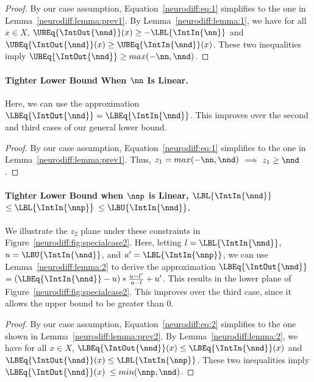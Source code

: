 \begin{proof}
By our case assumption, Equation~\ref{neurodiff:eq:1} simplifies to the one in
Lemma~\ref{neurodiff:lemma:prev1}. By Lemma~\ref{neurodiff:lemma:1}, we have for
all $ x \in X $,
$ \UBEq{\IntOut{\nnd}}(x) \geq -\LBL{\IntIn{\nn}} $ and
$ \UBEq{\IntOut{\nnd}}(x) \geq \UBEq{\IntIn{\nnd}}(x) $. These two inequalities
imply $ \UBEq{\IntOut{\nnd}} \geq max(-\nn, \nnd) $.
\end{proof}

\paragraph{Tighter Lower Bound When $ \nn $ Is Linear.}

Here, we can use the approximation $ \LBEq{\IntOut{\nnd}}
= \LBEq{\IntIn{\nnd}} $. This improves over the second and third cases
of our general lower bound.

\begin{proof}
By our case assumption, Equation~\ref{neurodiff:eq:1} simplifies to the one in
Lemma~\ref{neurodiff:lemma:prev1}. Thus, $ z_1 = max(-\nn, \nnd) $ $ \implies $
$ z_1 \geq \nnd $.
\end{proof}

\paragraph{Tighter Lower Bound when $ \nnp $ is Linear, $ \LBL{\IntIn{\nnd}}
$ $ \leq \LBL{\IntIn{\nnp}} $ $ \leq \LBU{\IntIn{\nnd}}$.}
We illustrate the $ z_2 $ plane under these constraints in
Figure~\ref{neurodiff:fig:specialcase2}.
Here, letting $ l = \LBL{\IntIn{\nnd}} $, $ u = \LBU{\IntIn{\nnd}} $,
and $ u' = \LBL{\IntIn{\nnp}} $, we can use Lemma~\ref{neurodiff:lemma:2} to
derive the approximation $ \LBEq{\IntOut{\nnd}} $ $ =
(\LBEq{\IntIn{\nnd}} - u)*\frac{u - l'}{u - l} + u' $. This results in the
lower plane of Figure~\ref{neurodiff:fig:specialcase2}. This improves
over the third case, since it allows the upper bound to be greater
than 0.

\begin{proof}
By our case assumption, Equation~\ref{neurodiff:eq:2} simplifies to the one shown
in
Lemma~\ref{neurodiff:lemma:prev2}. By Lemma~\ref{neurodiff:lemma:2}, we have for
all $ x \in X $,
$ \LBEq{\IntOut{\nnd}}(x) \leq \LBEq{\IntIn{\nnd}}(x) $ and
$ \LBEq{\IntOut{\nnd}}(x) \leq \LBL{\IntIn{\nnp}} $. These two inequalities
imply
$ \LBEq{\IntOut{\nnd}}(x)$ $ \leq min(\nnp, \nnd) $.
\end{proof}


